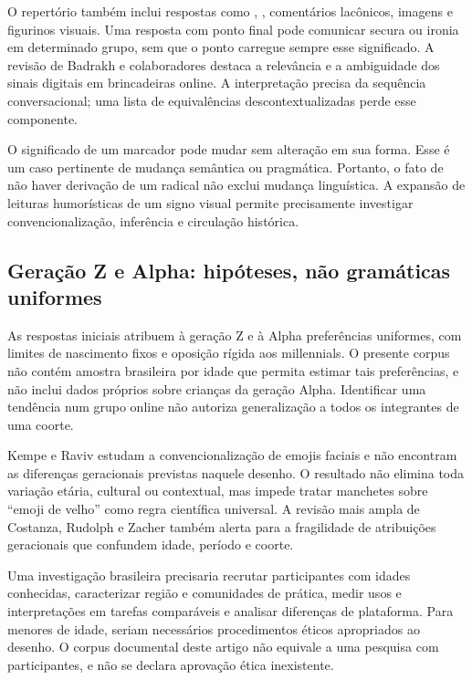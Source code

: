 O repertório também inclui respostas como , , comentários lacônicos, imagens e figurinos visuais. Uma resposta com ponto final pode comunicar secura ou ironia em determinado grupo, sem que o ponto carregue sempre esse significado. A revisão de Badrakh e colaboradores \cite{badrakh2024} destaca a relevância e a ambiguidade dos sinais digitais em brincadeiras online. A interpretação precisa da sequência conversacional; uma lista de equivalências descontextualizadas perde esse componente.

O significado de um marcador pode mudar sem alteração em sua forma. Esse é um caso pertinente de mudança semântica ou pragmática. Portanto, o fato de não haver derivação de um radical não exclui mudança linguística. A expansão de leituras humorísticas de um signo visual permite precisamente investigar convencionalização, inferência e circulação histórica.

\subsection{Geração Z e Alpha: hipóteses, não gramáticas uniformes}
As respostas iniciais atribuem à geração Z e à Alpha preferências uniformes, com limites de nascimento fixos e oposição rígida aos millennials. O presente corpus não contém amostra brasileira por idade que permita estimar tais preferências, e não inclui dados próprios sobre crianças da geração Alpha. Identificar uma tendência num grupo online não autoriza generalização a todos os integrantes de uma coorte.

Kempe e Raviv \cite{kempe2025} estudam a convencionalização de emojis faciais e não encontram as diferenças geracionais previstas naquele desenho. O resultado não elimina toda variação etária, cultural ou contextual, mas impede tratar manchetes sobre ``emoji de velho'' como regra científica universal. A revisão mais ampla de Costanza, Rudolph e Zacher \cite{costanza2023} também alerta para a fragilidade de atribuições geracionais que confundem idade, período e coorte.

Uma investigação brasileira precisaria recrutar participantes com idades conhecidas, caracterizar região e comunidades de prática, medir usos e interpretações em tarefas comparáveis e analisar diferenças de plataforma. Para menores de idade, seriam necessários procedimentos éticos apropriados ao desenho. O corpus documental deste artigo não equivale a uma pesquisa com participantes, e não se declara aprovação ética inexistente.

